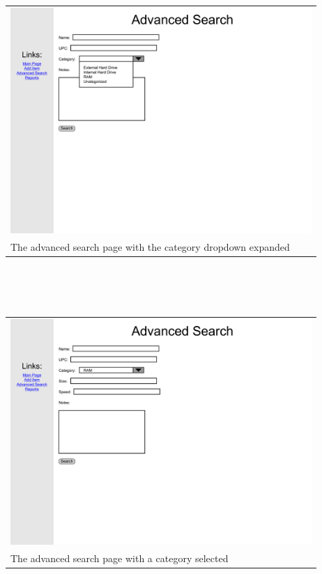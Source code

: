 \documentclass{article}
\begin{document}
\begin{tabular}{ p{4.5in} }
\includegraphics[keepaspectratio, width=4.5in]{advancedSearchF0S1.pdf} \\
The advanced search page with the category dropdown expanded
\end{tabular}\\
~\\
~\\
\begin{tabular}{ p{4.5in} }
\includegraphics[keepaspectratio, width=4.5in]{advancedSearchF0S2.pdf} \\
The advanced search page with a category selected
\end{tabular}\\
~\\
~\\
\end{document}
